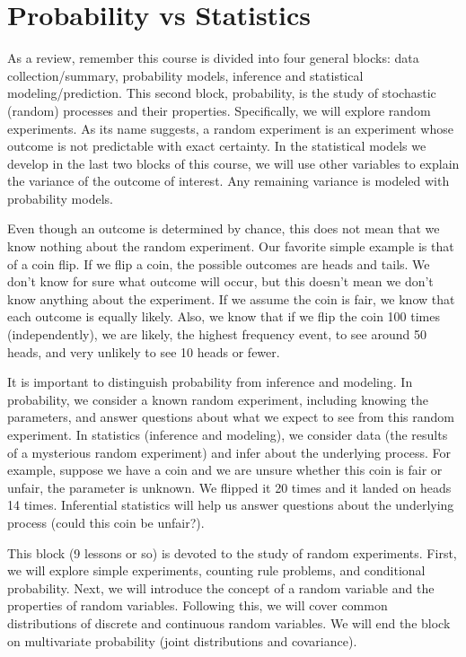 \documentclass[
]{book}
\begin{document}
\hypertarget{probability-vs-statistics}{%
\section{Probability vs Statistics}\label{probability-vs-statistics}}

As a review, remember this course is divided into four general blocks: data collection/summary, probability models, inference and statistical modeling/prediction. This second block, probability, is the study of stochastic (random) processes and their properties. Specifically, we will explore random experiments. As its name suggests, a random experiment is an experiment whose outcome is not predictable with exact certainty. In the statistical models we develop in the last two blocks of this course, we will use other variables to explain the variance of the outcome of interest. Any remaining variance is modeled with probability models.

Even though an outcome is determined by chance, this does not mean that we know nothing about the random experiment. Our favorite simple example is that of a coin flip. If we flip a coin, the possible outcomes are heads and tails. We don't know for sure what outcome will occur, but this doesn't mean we don't know anything about the experiment. If we assume the coin is fair, we know that each outcome is equally likely. Also, we know that if we flip the coin 100 times (independently), we are likely, the highest frequency event, to see around 50 heads, and very unlikely to see 10 heads or fewer.

It is important to distinguish probability from inference and modeling. In probability, we consider a known random experiment, including knowing the parameters, and answer questions about what we expect to see from this random experiment. In statistics (inference and modeling), we consider data (the results of a mysterious random experiment) and infer about the underlying process. For example, suppose we have a coin and we are unsure whether this coin is fair or unfair, the parameter is unknown. We flipped it 20 times and it landed on heads 14 times. Inferential statistics will help us answer questions about the underlying process (could this coin be unfair?).

This block (9 lessons or so) is devoted to the study of random experiments. First, we will explore simple experiments, counting rule problems, and conditional probability. Next, we will introduce the concept of a random variable and the properties of random variables. Following this, we will cover common distributions of discrete and continuous random variables. We will end the block on multivariate probability (joint distributions and covariance).
\end{document}
